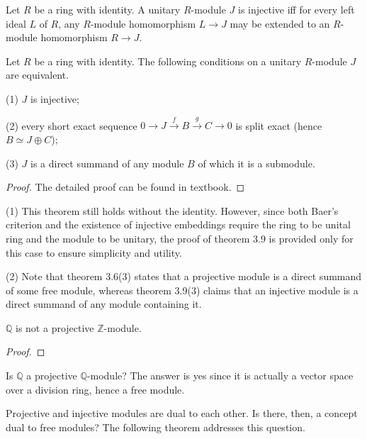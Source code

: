\documentclass{article}
\begin{document}
\begin{theorem}
    Let $R$ be a ring with identity. A unitary $R$-module $J$ is injective iff for every left ideal $L$ of $R$, any $R$-module homomorphism $L\to J$ may be extended to an $R$-module homomorphism $R\to J$.
\end{theorem}

\begin{theorem}
    Let $R$ be a ring with identity. The following conditions on a unitary $R$-module $J$ are equivalent.

    (1) $J$ is injective;

    (2) every short exact sequence $0\to J\xrightarrow{f}B\xrightarrow{g}C\to 0$ is split exact (hence $B\simeq J\oplus C$);

    (3) $J$ is a direct summand of any module $B$ of which it is a submodule.
\end{theorem}
\begin{proof}
    The detailed proof can be found in textbook.
\end{proof}

\begin{remark}
    (1) This theorem still holds without the identity. However, since both Baer's criterion and the existence of injective embeddings require the ring to be unital ring and the module to be unitary, the proof of theorem 3.9 is provided only for this case to ensure simplicity and utility.

    (2) Note that theorem 3.6(3) states that a projective module is a direct summand of some free module, whereas theorem 3.9(3) claims that an injective module is a direct summand of any module containing it. 
\end{remark}

\begin{example}
    $\mathbb{Q}$ is not a projective $\mathbb{Z}$-module.
\end{example}
\begin{proof}
    
\end{proof}
Is $\mathbb{Q}$ a projective $\mathbb{Q}$-module? The answer is yes since it is actually a vector space over a division ring, hence a free module.

Projective and injective modules are dual to each other. Is there, then, a concept dual to free modules? The following theorem addresses this question.
\end{document}
